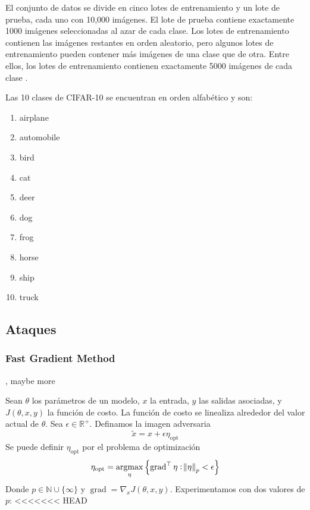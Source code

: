 El conjunto de datos se divide en cinco lotes de entrenamiento y un lote de prueba, cada uno con 10,000 imágenes. El lote de prueba contiene exactamente 1000 imágenes seleccionadas al azar de cada clase. Los lotes de entrenamiento contienen las imágenes restantes en orden aleatorio, pero algunos lotes de entrenamiento pueden contener más imágenes de una clase que de otra. Entre ellos, los lotes de entrenamiento contienen exactamente 5000 imágenes de cada clase \cite{cifarsite}. 

Las 10 clases de CIFAR-10 se encuentran en orden alfabético y son:
\begin{multicols}{5}
\begin{enumerate}
    \item airplane
    \item automobile
    \item bird
    \item cat
    \item deer
    \item dog
    \item frog
    \item horse
    \item ship
    \item truck
\end{enumerate}
\end{multicols}


\subsection{Ataques}

\subsubsection{Fast Gradient Method}
\cite{goodfellow2015explaining}, maybe more

Sean $\theta$ los parámetros de un modelo, $x$ la entrada, $y$ las salidas asociadas, y $J(\theta, x, y)$ la función de costo. La función de costo se linealiza alrededor del valor actual de $\theta$. Sea $\epsilon \in \mathbb{R}^+$. Definamos la imagen adversaria 
\[\tilde{x} = x + \epsilon \eta_{\text{opt}}\]
Se puede definir $\eta_{\text{opt}}$ por el problema de optimización
\[\eta_{\text{opt}} = \operatornamewithlimits{argmax}_{\eta}\left\{ \operatorname{grad} ^\top \eta: \norm{\eta}_p< \epsilon\right\}\]
Donde $p \in \mathbb{N} \cup \{\infty\}$ y $\operatorname{grad} = \nabla_x J(\theta, x, y)$. Experimentamos con dos valores de $p$:
<<<<<<< HEAD
    
